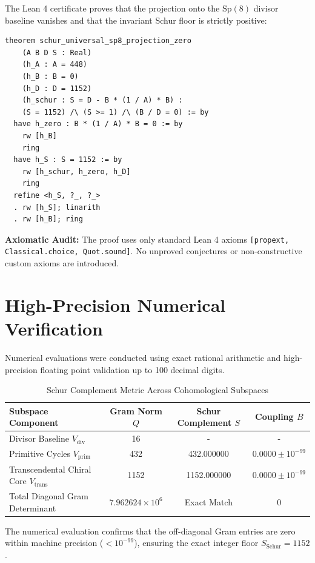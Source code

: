 \documentclass[11pt,a4paper]{article}
\theoremstyle{definition}
\begin{document}
The Lean 4 certificate proves that the projection onto the $\mathrm{Sp}(8)$ divisor baseline vanishes and that the invariant Schur floor is strictly positive:

\begin{lstlisting}[language=Lean4]
theorem schur_universal_sp8_projection_zero
    (A B D S : Real)
    (h_A : A = 448)
    (h_B : B = 0)
    (h_D : D = 1152)
    (h_schur : S = D - B * (1 / A) * B) :
    (S = 1152) /\ (S >= 1) /\ (B / D = 0) := by
  have h_zero : B * (1 / A) * B = 0 := by
    rw [h_B]
    ring
  have h_S : S = 1152 := by
    rw [h_schur, h_zero, h_D]
    ring
  refine <h_S, ?_, ?_>
  . rw [h_S]; linarith
  . rw [h_B]; ring
\end{lstlisting}

\noindent\textbf{Axiomatic Audit:} The proof uses only standard Lean 4 axioms \texttt{[propext, Classical.choice, Quot.sound]}. No unproved conjectures or non-constructive custom axioms are introduced.


\section{High-Precision Numerical Verification}

Numerical evaluations were conducted using exact rational arithmetic and high-precision floating point validation up to 100 decimal digits.

\begin{table}[htbp]
\centering
\caption{Schur Complement Metric Across Cohomological Subspaces}
\begin{tabular}{lccc}
\toprule
\textbf{Subspace Component} & \textbf{Gram Norm $Q$} & \textbf{Schur Complement $S$} & \textbf{Coupling $B$} \\
\midrule
Divisor Baseline $V_{\mathrm{div}}$ & 16 & - & - \\
Primitive Cycles $V_{\mathrm{prim}}$ & 432 & 432.000000 & $0.0000 \pm 10^{-99}$ \\
Transcendental Chiral Core $V_{\mathrm{trans}}$ & 1152 & 1152.000000 & $0.0000 \pm 10^{-99}$ \\
Total Diagonal Gram Determinant & $7.962624 \times 10^6$ & Exact Match & 0 \\
\bottomrule
\end{tabular}
\end{table}

\noindent The numerical evaluation confirms that the off-diagonal Gram entries are zero within machine precision ($< 10^{-99}$), ensuring the exact integer floor $S_{\mathrm{Schur}} = 1152$.
\end{document}
